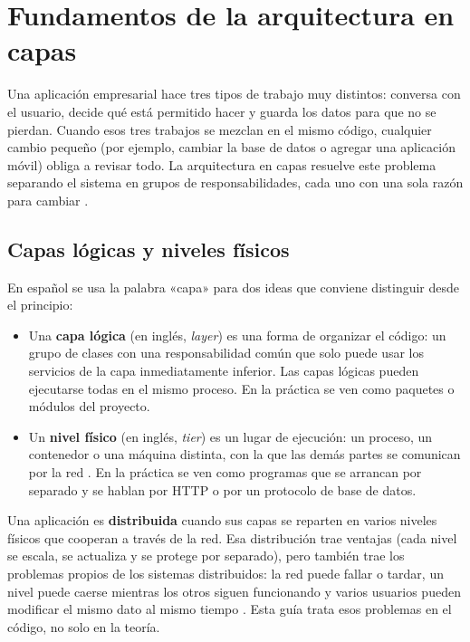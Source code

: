 \chapter{Fundamentos de la arquitectura en capas}\label{cap:fundamentos}

Una aplicación empresarial hace tres tipos de trabajo muy distintos: conversa con el usuario, decide qué está permitido hacer y guarda los datos para que no se pierdan. Cuando esos tres trabajos se mezclan en el mismo código, cualquier cambio pequeño (por ejemplo, cambiar la base de datos o agregar una aplicación móvil) obliga a revisar todo. La arquitectura en capas resuelve este problema separando el sistema en grupos de responsabilidades, cada uno con una sola razón para cambiar \cite{fowler2002patterns,richards2025fundamentals}.

\section{Capas lógicas y niveles físicos}

En español se usa la palabra «capa» para dos ideas que conviene distinguir desde el principio:

\begin{itemize}
	\item Una \textbf{capa lógica} (en inglés, \emph{layer}) es una forma de organizar el código: un grupo de clases con una responsabilidad común que solo puede usar los servicios de la capa inmediatamente inferior. Las capas lógicas pueden ejecutarse todas en el mismo proceso. En la práctica se ven como paquetes o módulos del proyecto.
	\item Un \textbf{nivel físico} (en inglés, \emph{tier}) es un lugar de ejecución: un proceso, un contenedor o una máquina distinta, con la que las demás partes se comunican por la red \cite{fowler2002patterns,vansteen2023distributed}. En la práctica se ven como programas que se arrancan por separado y se hablan por HTTP o por un protocolo de base de datos.
\end{itemize}

Una aplicación es \textbf{distribuida} cuando sus capas se reparten en varios niveles físicos que cooperan a través de la red. Esa distribución trae ventajas (cada nivel se escala, se actualiza y se protege por separado), pero también trae los problemas propios de los sistemas distribuidos: la red puede fallar o tardar, un nivel puede caerse mientras los otros siguen funcionando y varios usuarios pueden modificar el mismo dato al mismo tiempo \cite{vansteen2023distributed,kleppmann2026designing}. Esta guía trata esos problemas en el código, no solo en la teoría.

